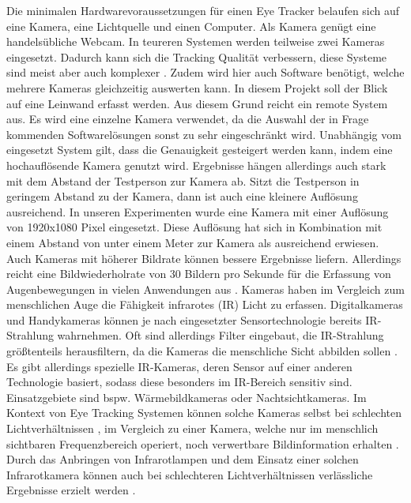 Die minimalen Hardwarevoraussetzungen für einen Eye Tracker belaufen sich auf eine Kamera, eine Lichtquelle und einen Computer. Als Kamera genügt eine handelsübliche Webcam. In teureren Systemen werden teilweise zwei Kameras eingesetzt. Dadurch kann sich die Tracking Qualität verbessern, diese Systeme sind meist aber auch komplexer \cite{lit_website_eyeware_eyetracker_blog}. Zudem wird hier auch Software benötigt, welche mehrere Kameras gleichzeitig auswerten kann.
In diesem Projekt soll der Blick auf eine Leinwand erfasst werden. Aus diesem Grund reicht ein remote System aus. Es wird eine einzelne Kamera verwendet, da die Auswahl der in Frage kommenden Softwarelösungen sonst zu sehr eingeschränkt wird. 
Unabhängig vom eingesetzt System gilt, dass die Genauigkeit gesteigert werden kann, indem eine hochauflösende Kamera genutzt wird. Ergebnisse hängen allerdings auch stark mit dem Abstand der Testperson zur Kamera ab. Sitzt die Testperson in geringem Abstand zu der Kamera, dann ist auch eine kleinere Auflösung ausreichend. In unseren Experimenten wurde eine Kamera mit einer Auflösung von 1920x1080 Pixel eingesetzt. Diese Auflösung hat sich in Kombination mit einem Abstand von unter einem Meter zur Kamera als ausreichend erwiesen. Auch Kameras mit höherer Bildrate können bessere Ergebnisse liefern. Allerdings reicht eine \Gls{Bildwiederholrate} von 30 Bildern pro Sekunde für die Erfassung von Augenbewegungen in vielen Anwendungen aus \cite{lit_tracking_framerate}. Kameras haben im Vergleich zum menschlichen Auge die Fähigkeit infrarotes ({\acs{IR}}) Licht zu erfassen. Digitalkameras und Handykameras können je nach eingesetzter Sensortechnologie bereits {\acs{IR}}-Strahlung wahrnehmen. Oft sind allerdings Filter eingebaut, die {\acs{IR}}-Strahlung größtenteils herausfiltern, da die Kameras die menschliche Sicht abbilden sollen \cite{lit_website_eyeware_eyetracker_blog}. Es gibt allerdings spezielle {\acs{IR}}-Kameras, deren Sensor auf einer anderen Technologie basiert, sodass diese besonders im {\acs{IR}}-Bereich sensitiv sind. Einsatzgebiete sind bspw. Wärmebildkameras oder Nachtsichtkameras. Im Kontext von Eye Tracking Systemen können solche Kameras selbst bei schlechten Lichtverhältnissen , im Vergleich zu einer Kamera, welche nur im menschlich sichtbaren Frequenzbereich operiert, noch verwertbare Bildinformation erhalten \cite{lit_article_infrared}.
Durch das Anbringen von Infrarotlampen und dem Einsatz einer solchen Infrarotkamera können auch bei schlechteren Lichtverhältnissen verlässliche Ergebnisse erzielt werden \cite{lit_article_stateoftheart_eyetracker}.

